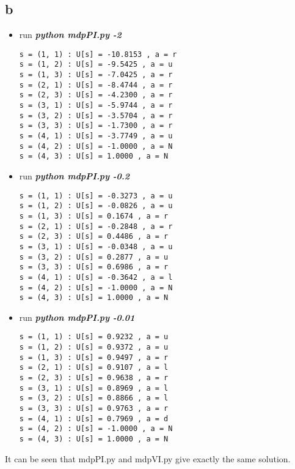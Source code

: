 \documentclass[12pt]{amsart}
\begin{document}
\subsection*{b}
\begin{itemize}
\item run \textit{\textbf{python mdpPI.py -2}}
\begin{verbatim}
s = (1, 1) : U[s] = -10.8153 , a = r
s = (1, 2) : U[s] = -9.5425 , a = u
s = (1, 3) : U[s] = -7.0425 , a = r
s = (2, 1) : U[s] = -8.4744 , a = r
s = (2, 3) : U[s] = -4.2300 , a = r
s = (3, 1) : U[s] = -5.9744 , a = r
s = (3, 2) : U[s] = -3.5704 , a = r
s = (3, 3) : U[s] = -1.7300 , a = r
s = (4, 1) : U[s] = -3.7749 , a = u
s = (4, 2) : U[s] = -1.0000 , a = N
s = (4, 3) : U[s] = 1.0000 , a = N
\end{verbatim}
\item run \textit{\textbf{python mdpPI.py -0.2}}
\begin{verbatim}
s = (1, 1) : U[s] = -0.3273 , a = u
s = (1, 2) : U[s] = -0.0826 , a = u
s = (1, 3) : U[s] = 0.1674 , a = r
s = (2, 1) : U[s] = -0.2848 , a = r
s = (2, 3) : U[s] = 0.4486 , a = r
s = (3, 1) : U[s] = -0.0348 , a = u
s = (3, 2) : U[s] = 0.2877 , a = u
s = (3, 3) : U[s] = 0.6986 , a = r
s = (4, 1) : U[s] = -0.3642 , a = l
s = (4, 2) : U[s] = -1.0000 , a = N
s = (4, 3) : U[s] = 1.0000 , a = N
\end{verbatim}
\item run \textit{\textbf{python mdpPI.py -0.01}}
\begin{verbatim}
s = (1, 1) : U[s] = 0.9232 , a = u
s = (1, 2) : U[s] = 0.9372 , a = u
s = (1, 3) : U[s] = 0.9497 , a = r
s = (2, 1) : U[s] = 0.9107 , a = l
s = (2, 3) : U[s] = 0.9638 , a = r
s = (3, 1) : U[s] = 0.8969 , a = l
s = (3, 2) : U[s] = 0.8866 , a = l
s = (3, 3) : U[s] = 0.9763 , a = r
s = (4, 1) : U[s] = 0.7969 , a = d
s = (4, 2) : U[s] = -1.0000 , a = N
s = (4, 3) : U[s] = 1.0000 , a = N
\end{verbatim}
\end{itemize}
It can be seen that mdpPI.py and mdpVI.py give exactly the same solution.
\end{document}
